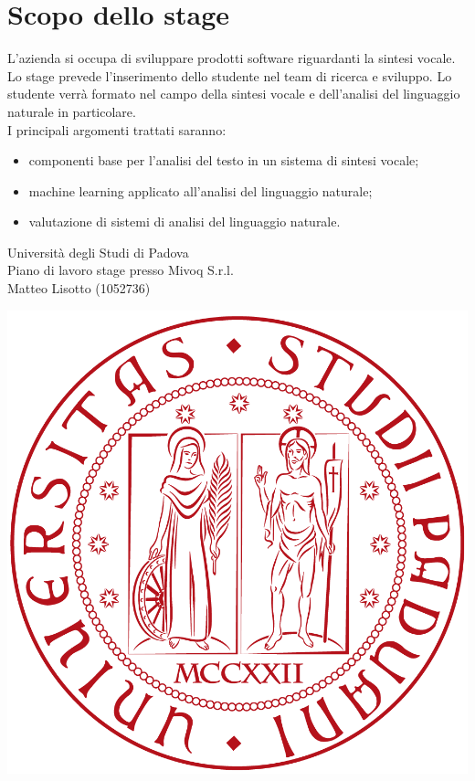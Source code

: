 \documentclass[11pt,notitlepage]{article}
\begin{document}
\section*{Scopo dello stage}

L'azienda si occupa di sviluppare prodotti software riguardanti la sintesi vocale.\\

\noindent Lo stage prevede l'inserimento dello studente nel team di ricerca e sviluppo. Lo studente verrà formato nel campo della sintesi vocale e dell'analisi del linguaggio naturale in particolare.\\ 

\noindent I principali argomenti trattati saranno:
\begin{itemize}
	\item componenti base per l'analisi del testo in un sistema di sintesi vocale;
	\item machine learning applicato all'analisi del linguaggio naturale;
	\item valutazione di sistemi di analisi del linguaggio naturale.
\end{itemize}

\newpage

\noindent
\parbox{0.7\columnwidth}{Università degli Studi di Padova\\
	Piano di lavoro stage presso Mivoq S.r.l.\\
	Matteo Lisotto (1052736)}
\parbox{0.3\columnwidth}{
	\hfill \includegraphics[scale=0.08]{immagini/logo-unipd.png}}
\end{document}

